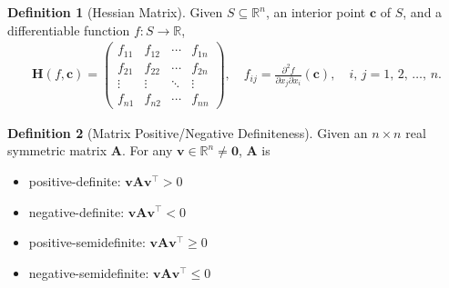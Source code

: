 \documentclass[10pt]{beamer}
\newcommand{\ds}{\displaystyle}
\theoremstyle{definition}
\newtheorem*{dfn}{Definition}
\newcommand{\vc}{\mathbf{c}}
\newcommand{\vv}{\mathbf{v}}
\newcommand{\vH}{\mathbf{H}}
\newcommand{\vA}{\mathbf{A}}
\newcommand{\vZero}{\mathbf{0}}
\begin{document}
\begin{frame}
\begin{dfn}[Hessian Matrix]
  Given $\ds S\subseteq\mathbb{R}^n$, an interior point $\vc$ of $S$, and a differentiable function $\ds f:S\to\mathbb{R}$, 
  \begin{align*}
    \vH(f, \vc) = \begin{pmatrix}f_{11} & f_{12} & \cdots & f_{1n} \\ f_{21} & f_{22} & \cdots & f_{2n} \\ \vdots & \vdots & \ddots & \vdots \\ f_{n1} & f_{n2} & \cdots & f_{nn}\end{pmatrix}, \quad f_{ij} = \frac{\partial^2 f}{\partial x_j\partial x_i}(\vc), \quad i,\,j = 1,\,2,\,\ldots,\,n.
  \end{align*}
\end{dfn}

\begin{dfn}[Matrix Positive/Negative Definiteness] 
  Given an $n\times n$ real symmetric matrix $\vA$. For any $\ds\vv\in\mathbb{R}^n\ne\vZero$, $\vA$ is
  \begin{multicols}{2}
    \begin{itemize}
      \item positive-definite: $\ds\vv\vA\vv^\top > 0$ 
      \item negative-definite: $\ds\vv\vA\vv^\top < 0$
      \item positive-semidefinite: $\ds\vv\vA\vv^\top\geqslant 0$
      \item negative-semidefinite: $\ds\vv\vA\vv^\top\leqslant 0$
    \end{itemize}
  \end{multicols}
\end{dfn}
\end{frame}
\end{document}
